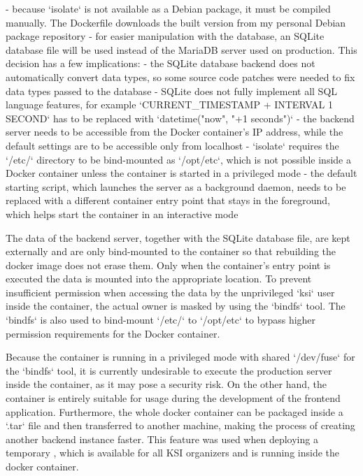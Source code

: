 \documentclass[
  digital, %
  oneside, %
  lof,     %
  nolot,     %
]{fithesis4}
\begin{document}
{- because `isolate` is not available as a Debian package, it must be compiled manually. The Dockerfile downloads the built version from my personal Debian package repository
- for easier manipulation with the database, an SQLite database file will be used instead of the MariaDB server used on production. This decision has a few implications:
    - the SQLite database backend does not automatically convert data types, so some source code patches were needed to fix data types passed to the database
    - SQLite does not fully implement all SQL language features, for example `CURRENT_TIMESTAMP + INTERVAL 1 SECOND` has to be replaced with `datetime("now", "+1 seconds")`
- the backend server needs to be accessible from the Docker container's IP address, while the default settings are to be accessible only from localhost
- `isolate` requires the `/etc/` directory to be bind-mounted as `/opt/etc`, which is not possible inside a Docker container unless the container is started in a privileged mode
- the default starting script, which launches the server as a background daemon, needs to be replaced with a different container entry point that stays in the foreground, which helps start the container in an interactive mode

The data of the backend server, together with the SQLite database file, are kept externally and are only bind-mounted to the container so that rebuilding the docker image does not erase them. Only when the container's entry point is executed the data is mounted into the appropriate location. To prevent insufficient permission when accessing the data by the unprivileged `ksi` user inside the container, the actual owner is masked by using the `bindfs` tool. The `bindfs` is also used to bind-mount `/etc/` to `/opt/etc` to bypass higher permission requirements for the Docker container. 

Because the container is running in a privileged mode with shared `/dev/fuse` for the `bindfs` tool, it is currently undesirable to execute the production server inside the container, as it may pose a security risk. On the other hand, the container is entirely suitable for usage during the development of the frontend application. Furthermore, the whole docker container can be packaged inside a `.tar` file and then transferred to another machine, making the process of creating another backend instance faster. This feature was used when deploying a temporary , which is available for all \acrshort{KSI} organizers and is running inside the docker container.

}
\end{document}
